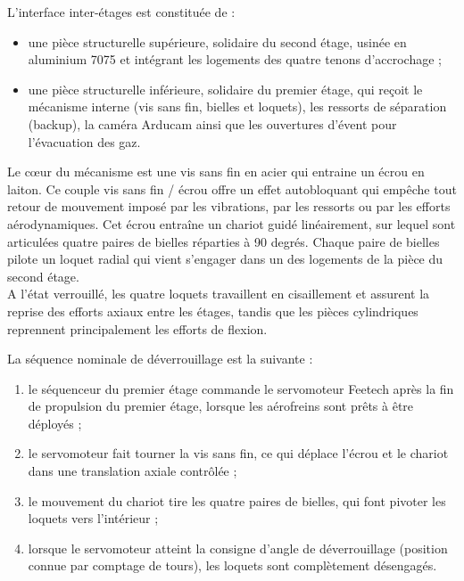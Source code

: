 L'interface inter-étages est constituée de :
\begin{itemize}
    \item une pièce structurelle supérieure, solidaire du second étage, usinée en aluminium 7075 et intégrant les logements des
    quatre tenons d'accrochage ;
    \item une pièce structurelle inférieure, solidaire du premier étage, qui reçoit le mécanisme interne (vis sans fin, bielles
    et loquets), les ressorts de séparation (backup), la caméra Arducam ainsi que les ouvertures d'évent pour l'évacuation des
    gaz.\\
\end{itemize}

Le cœur du mécanisme est une vis sans fin en acier qui entraine un écrou en laiton. Ce couple vis sans fin / écrou offre un
effet autobloquant qui empêche tout retour de mouvement imposé par les vibrations, par les ressorts ou par les efforts
aérodynamiques. Cet écrou entraîne un chariot guidé linéairement, sur lequel sont articulées quatre paires de bielles réparties
à 90 degrés. Chaque paire de bielles pilote un loquet radial qui vient s'engager dans un des logements de la pièce du second
étage.\\

A l'état verrouillé, les quatre loquets travaillent en cisaillement et assurent la reprise des efforts axiaux entre les étages,
tandis que les pièces cylindriques reprennent principalement les efforts de flexion.


La séquence nominale de déverrouillage est la suivante :
\begin{enumerate}
    \item le séquenceur du premier étage commande le servomoteur Feetech après la fin de propulsion du premier étage, lorsque
    les aérofreins sont prêts à être déployés ;
    \item le servomoteur fait tourner la vis sans fin, ce qui déplace l'écrou et le chariot dans une translation axiale contrôlée ;
    \item le mouvement du chariot tire les quatre paires de bielles, qui font pivoter les loquets vers l'intérieur ;
    \item lorsque le servomoteur atteint la consigne d'angle de déverrouillage (position connue par comptage de tours), les
    loquets sont complètement désengagés.\\
\end{enumerate}

